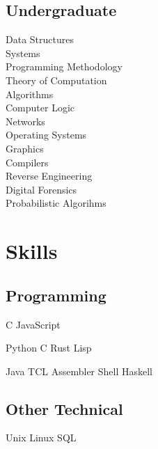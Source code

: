 \documentclass[]{deedy-resume-openfont}
\begin{document}
\begin{minipage}[t]{0.33\textwidth}
\subsection{Undergraduate}
Data Structures \\
Systems \\
Programming Methodology \\
Theory of Computation \\
Algorithms \\
Computer Logic \\
Networks \\
Operating Systems \\
Graphics \\
Compilers \\
Reverse Engineering \\
Digital Forensics \\
Probabilistic Algorihms



\section{Skills}
\subsection{Programming}

C \textbullet{} JavaScript 

Python \textbullet{} C \textbullet{} Rust \textbullet{} Lisp

Java \textbullet{} TCL \textbullet{} Assembler \textbullet{} Shell 
\textbullet{} Haskell

\sectionsep{}

\subsection{Other Technical}
Unix \textbullet{} Linux \textbullet{} SQL

\sectionsep{}

%
%

\end{minipage} 
\hfill
\end{document}
